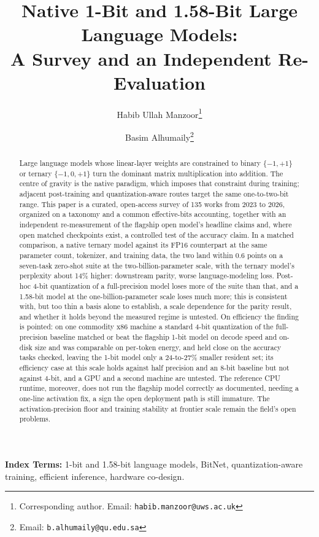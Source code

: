 \documentclass[11pt]{article}
\title{Native 1-Bit and 1.58-Bit Large Language Models:\\[2pt]
 A Survey and an Independent Re-Evaluation}
\author[1]{Habib Ullah Manzoor\thanks{Corresponding author. Email: \texttt{habib.manzoor@uws.ac.uk}}}
\author[2]{Basim Alhumaily\thanks{Email: \texttt{b.alhumaily@qu.edu.sa}}}
\affil[1]{School of Computing, Engineering and Physical Sciences, University of the West of Scotland, UK}
\affil[2]{Department of Electrical Engineering, College of Engineering, Qassim University, Buraydah 52571, Saudi Arabia}
\date{}
\begin{document}
\maketitle
\begin{abstract}
\noindent Large language models whose linear-layer weights are constrained to
binary $\{-1,+1\}$ or ternary $\{-1,0,+1\}$ turn the dominant matrix
multiplication into addition. The centre of gravity is the native paradigm, which
imposes that constraint during training; adjacent post-training and
quantization-aware routes target the same one-to-two-bit range. This paper is a curated,
open-access survey of 135 works from 2023 to 2026, organized on a taxonomy and a common
effective-bits accounting, together with an independent re-measurement of the flagship
open model's headline claims and, where open matched checkpoints exist, a controlled test
of the accuracy claim. In a matched comparison, a native ternary model against its FP16
counterpart at the same parameter count, tokenizer, and training data, the two land
within 0.6 points on a seven-task zero-shot suite at the two-billion-parameter scale,
with the ternary model's perplexity about 14\% higher: downstream parity, worse
language-modeling loss. Post-hoc 4-bit quantization of a full-precision model loses more
of the suite than that, and a 1.58-bit model at the one-billion-parameter scale loses
much more; this is consistent with, but too thin a basis alone to establish, a scale
dependence for the parity result, and whether it holds beyond the measured regime is
untested. On efficiency the finding is pointed: on
one commodity x86 machine a standard 4-bit quantization of the full-precision baseline
matched or beat the flagship 1-bit model on decode speed and on-disk size and was
comparable on per-token energy, and held close on the accuracy tasks checked, leaving the
1-bit model only a 24-to-27\% smaller resident set; its efficiency case at this scale
holds against half precision and an 8-bit baseline but not against 4-bit, and a GPU and a
second machine are untested. The reference CPU
runtime, moreover, does not run the flagship model correctly as documented, needing a
one-line activation fix, a sign the open deployment path is still immature. The
activation-precision floor and training stability at frontier scale remain the field's
open problems.
\end{abstract}

\noindent\textbf{Index Terms:} 1-bit and 1.58-bit language models, BitNet,
quantization-aware training, efficient inference, hardware co-design.
\medskip
\end{document}
